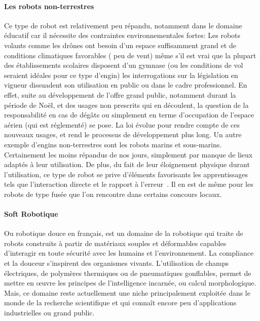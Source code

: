             \paragraph{Les robots non-terrestres}
                Ce type de robot est relativement peu répandu, notamment dans le domaine éducatif car il nécessite des contraintes environnementales fortes:
                    Les robots volants comme les drônes ont besoin d'un espace suffisamment grand et de conditions climatiques favorables ( \eg peu de vent) même s'il est vrai que la plupart des établissements scolaires disposent d'un gymnase (ou les conditions de vol seraient idéales pour ce type d'engin) les interrogations sur la législation en vigueur dissuadent son utilisation en public ou dans le cadre professionnel. En effet, suite au développement de l'offre grand public, notamment durant la période de Noël, et des usages non prescrits qui en découlent, la question de la responsabilité en cas de dégâts ou simplement en terme d'occupation de l'espace aérien (qui est réglementé) se pose. La loi évolue pour rendre compte de ces nouveaux usages, et rend le processus de développement plus long.
                    Un autre exemple d'engins non-terrestres sont les robots marins et sous-marins. Certainement les moins répandus de nos jours, simplement par manque de lieux adaptés à leur utilisation. De plus, du fait de leur éloignement physique durant l'utilisation, ce type de robot se prive d'éléments favorisants les apprentissages tels que l'interaction directe et le rapport à l'erreur~. 
                    Il en est de même pour les robots de type fusée que l'on rencontre dans certains concours locaux.
            \paragraph{Soft Robotique}
                Ou robotique douce en français, est un domaine de la robotique qui traite de robots construits à partir de matériaux souples et déformables capables d’interagir en toute sécurité avec les humains et l’environnement. La compliance et la douceur s'inspirent des organismes vivants. L'utilisation de champs électriques, de polymères thermiques ou de pneumatiques gonflables, permet de mettre en œuvre les principes de l'intelligence incarnée, ou calcul morphologique. Mais, ce domaine reste actuellement une niche principalement exploitée dans le monde de la recherche scientifique et qui connaît encore peu d'applications industrielles ou grand public.
